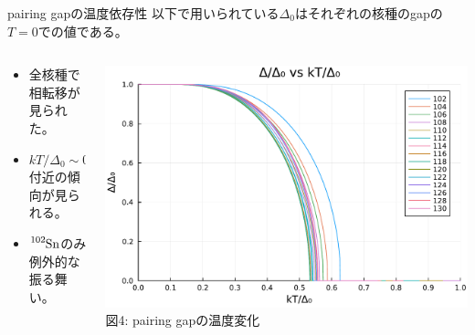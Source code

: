 \documentclass[aspectratio=169, 12pt, dvipdfmx]{beamer}
\begin{document}
\begin{frame}{pairing gapの温度依存性}
  以下で用いられている\(\Delta_0\)はそれぞれの核種のgapの\(T=0\)での値である。
  \begin{columns}[totalwidth=1.0\linewidth]
    \begin{column}[t]{0.4\linewidth}
      \begin{itemize}
        \item 全核種で相転移が見られた。
        \item $kT/\Delta_0\sim0.55$付近の傾向が見られる。
        \item $\ce{{}^{102}Sn}$のみ例外的な振る舞い。
      \end{itemize}
    \end{column}

    \begin{column}[T]{0.6\linewidth}
      \centering
      \includegraphics[width=\textwidth]{Comp_FT_dT.pdf}
      \vspace{5pt} %
      \scriptsize 図4: pairing gapの温度変化
  \end{column}
  \end{columns}
\end{frame}
\end{document}
